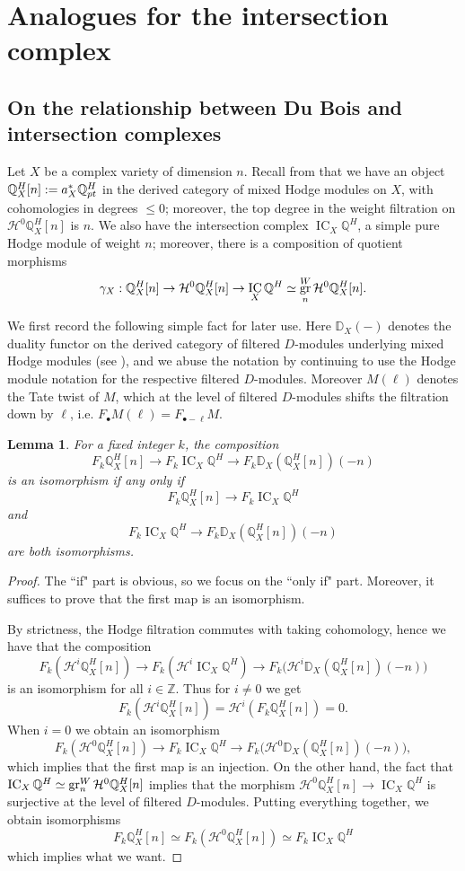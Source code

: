 \documentclass[11pt]{amsart}
\newtheorem{lemma}[equation]{Lemma}
\theoremstyle{definition}
\theoremstyle{plain}
\renewcommand{\H}{\mathcal H}
\newcommand{\QQ}{\mathbb Q}
\newcommand{\ZZ}{\mathbb Z}
\newcommand{\DDD}{\mathbb D}
\DeclareMathOperator{\IC}{IC}
\DeclareMathOperator{\gr}{{\rm gr}}
\begin{document}
\section{Analogues for the intersection complex}\label{ch:IC}

\subsection{On the relationship between Du Bois and intersection complexes}
Let $X$ be a complex variety of dimension $n$. Recall from \cite[Section 4.5]{Saito-MHM} that we have an object $\QQ^H_X[n] : = a_X^* \QQ^H_{\rm pt}$ in the derived category of mixed Hodge modules on $X$, with cohomologies in degrees $\le 0$; moreover, the top degree in the weight filtration on $\H^0  \QQ^H_X[n]$ is $n$. We also have the intersection complex $\IC_X\QQ^H$, a simple pure Hodge module of weight $n$; moreover, there is a composition of quotient morphisms
$$\gamma_X: \QQ^H_X[n]\to  \H^0  \QQ^H_X[n]\to \IC_X\QQ^H \simeq \gr^W_n  \H^0  \QQ^H_X[n].$$

We first record the following simple fact for later use. Here $\DDD_X (-)$ denotes the duality functor on the derived category of filtered $D$-modules underlying mixed Hodge modules (see \cite[Section 2.4]{Saito-PMHM}), and we abuse the notation by continuing to use the Hodge module notation for the respective filtered $D$-modules. Moreover $M (\ell)$ denotes the Tate twist of $M$, which at the level of filtered $D$-modules shifts the filtration down by $\ell$, i.e. 
$F_\bullet M(\ell) = F_{\bullet - \ell} M$.

\begin{lemma} \label{lemma: self dual of Q^H_X and rational homology}
    For a fixed integer $k$, the composition
    \[F_k \QQ^H_X[n] \to F_k \IC_X \QQ^H \to F_k \DDD_X(\QQ^H_X[n])(-n)\]
    is an isomorphism if any only if
    \[F_k \QQ^H_X[n] \to F_k \IC_X \QQ^H\]
    and 
    \[F_k \IC_X \QQ^H \to F_k \DDD_X(\QQ^H_X[n])(-n)\]
    are both isomorphisms.
\end{lemma}
\begin{proof}
The ``if" part is obvious, so we focus on the ``only if" part. Moreover, it suffices to prove that the first map is an isomorphism.

By strictness, the Hodge filtration commutes with taking cohomology, hence we have that the composition 
    \[F_k (\H^i \QQ^H_X[n]) \to F_k (\H^i \IC_X \QQ^H) \to F_k \big(\H^i \DDD_X(\QQ^H_X[n])(-n)\big)\]
    is an isomorphism for all $i \in \ZZ$. Thus for $i\neq 0$ we get 
    \[F_k (\H^i \QQ^H_X[n]) = \H^i(F_k \QQ^H_X[n]) = 0.\]
     When $i = 0$ we obtain an isomorphism 
    \[F_k (\H^0 \QQ^H_X[n]) \to  F_k \IC_X \QQ^H \to  F_k \big(\H^0 \DDD_X(\QQ^H_X[n])(-n)\big),\]
which implies that the first map is an injection.
   On the other hand, the fact that $ \IC_X\QQ^H \simeq \gr^W_n  \H^0  \QQ^H_X[n]$ implies that the morphism $\H^0  \QQ^H_X[n]\to \IC_X\QQ^H$ is 
   surjective at the level of  filtered $D$-modules. Putting everything together, we obtain isomorphisms
    \[F_k \QQ^H_X[n] \simeq F_k (\H^0 \QQ^H_X[n]) \simeq F_k \IC_X \QQ^H \]
   which implies what we want.
   \end{proof}
\end{document}
